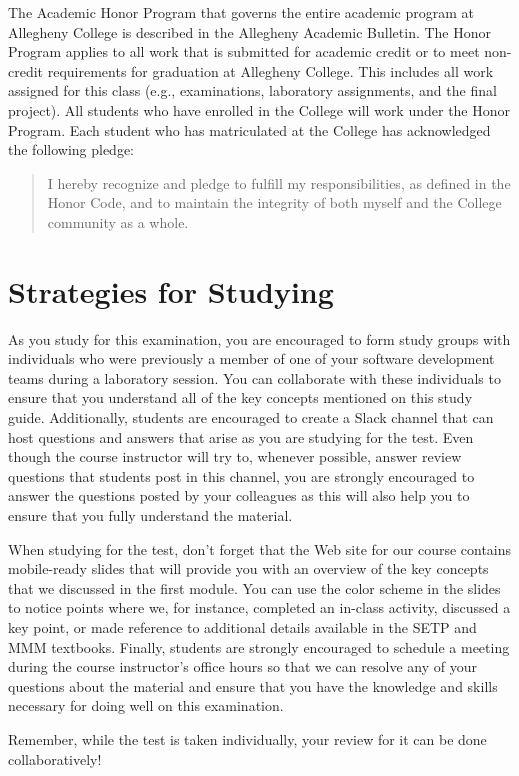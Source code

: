The Academic Honor Program that governs the entire academic program at Allegheny College is described in the Allegheny
Academic Bulletin.  The Honor Program applies to all work that is submitted for academic credit or to meet non-credit
requirements for graduation at Allegheny College.  This includes all work assigned for this class (e.g., examinations,
laboratory assignments, and the final project).  All students who have enrolled in the College will work under the Honor
Program.  Each student who has matriculated at the College has acknowledged the following pledge:

\vspace*{-.11in}
\begin{quote}
  I hereby recognize and pledge to fulfill my responsibilities, as defined in the Honor Code, and to maintain the
  integrity of both myself and the College community as a whole.
\end{quote}
\vspace*{-.11in}

\vspace*{-.15in}
\section*{Strategies for Studying}
\vspace*{-.05in}

As you study for this examination, you are encouraged to form study groups with individuals who were previously a
member of one of your software development teams during a laboratory session. You can collaborate with these individuals
to ensure that you understand all of the key concepts mentioned on this study guide. Additionally, students are
encouraged to create a Slack channel that can host questions and answers that arise as you are studying for the test.
Even though the course instructor will try to, whenever possible, answer review questions that students post in this
channel, you are strongly encouraged to answer the questions posted by your colleagues as this will also help you to
ensure that you fully understand the material.

When studying for the test, don't forget that the Web site for our course contains mobile-ready slides that will provide
you with an overview of the key concepts that we discussed in the first module. You can use the color scheme in the
slides to notice points where we, for instance, completed an in-class activity, discussed a key point, or made reference
to additional details available in the SETP and MMM textbooks. Finally, students are strongly encouraged to schedule a
meeting during the course instructor's office hours so that we can resolve any of your questions about the material and
ensure that you have the knowledge and skills necessary for doing well on this examination. 

Remember, while the test is taken individually, your review for it can be done collaboratively!


